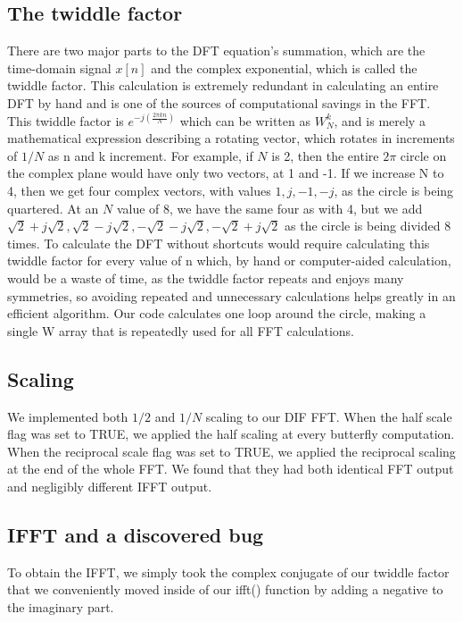 \documentclass{bannerReport}
\begin{document}
\subsection{The twiddle factor}
There are two major parts to the DFT equation’s summation, which are the time-domain signal $x[n]$ and the complex exponential, which is called the twiddle factor. This calculation is extremely redundant in calculating an entire DFT by hand and is one of the sources of computational savings in the FFT. This twiddle factor is $e^{-j(\frac{2 \pi kn}{N} )}$ which can be written as $W^{k}_N$, and is merely a mathematical expression describing a rotating vector, which rotates in increments of  $1/N$ as n and k increment. For example, if $N$ is 2, then the entire $2 \pi$ circle on the complex plane would have only two vectors, at 1 and -1. If we increase N to 4, then we get four complex vectors, with values $1, j, -1, -j$, as the circle is being quartered. At an $N$ value of 8, we have the same four as with 4, but we add $\sqrt{2}+j\sqrt{2}, \sqrt{2}-j\sqrt{2}, -\sqrt{2}-j\sqrt{2}, -\sqrt{2}+j\sqrt{2}$ as the circle is being divided 8 times. To calculate the DFT without shortcuts would require calculating this twiddle factor for every value of n which, by hand or computer-aided calculation, would be a waste of time, as the twiddle factor repeats and enjoys many symmetries, so avoiding repeated and unnecessary calculations helps greatly in an efficient algorithm. Our code calculates one loop around the circle, making a single W array that is repeatedly used for all FFT calculations. 

\subsection{Scaling}
We implemented both $1/2$ and $1/N$ scaling to our DIF FFT. When the half scale flag was set to {\mono TRUE}, we applied the half scaling at every butterfly computation. When the reciprocal scale flag was set to {\mono TRUE}, we applied the reciprocal scaling at the end of the whole FFT. We found that they had both identical FFT output and negligibly different IFFT output.

\subsection{IFFT and a discovered bug}
To obtain the IFFT, we simply took the complex conjugate of our twiddle factor that we conveniently moved inside of our {\mono ifft()} function by adding a negative to the imaginary part.
\end{document}
